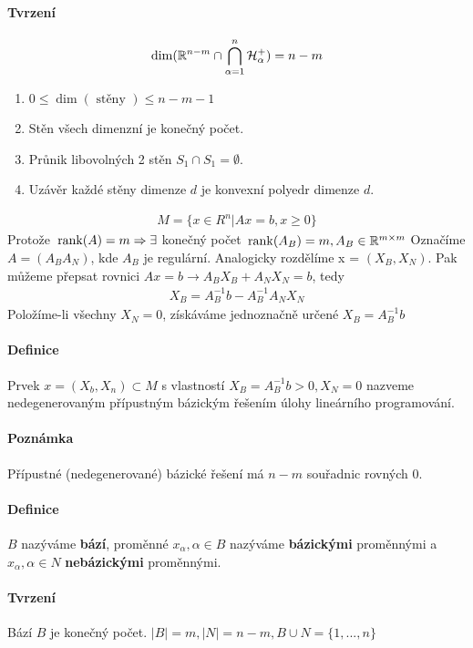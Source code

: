 \documentclass[a4paper,12pt,titlepage]{article}
\begin{document}
\paragraph{Tvrzení}
\begin{align}
	\dim( \mathbb{R}^{n-m} \cap \bigcap_{\alpha=1}^n \mathcal{H}_\alpha^+ ) = n - m 
\end{align}
\begin{enumerate}
	\item $0 \le \dim( \text{ stěny } ) \le n-m-1$
	\item Stěn všech dimenzní je konečný počet.
	\item Průnik libovolných 2 stěn $S_1 \cap S_1 = \emptyset$. 
	\item Uzávěr každé stěny dimenze $d$ je konvexní polyedr dimenze $d$.
\end{enumerate}
\begin{align}
	M = \{ x \in R^n | Ax = b, x \ge 0 \}
\end{align}
Protože $\operatorname*{\,rank}(A) = m \Rightarrow \exists$ konečný počet $\operatorname*{\,rank}(A_B) = m, A_B
\in \mathbb{R}^{m\times m}$
Označíme $A = (A_B A_N)$, kde $A_B$ je regulární. Analogicky rozdělíme x = $(X_B,
X_N)$. Pak můžeme přepsat rovnici $Ax = b \to A_B X_B + A_N X_N = b$, 
tedy 
\begin{align}
	X_B = A_B^{-1}b - A_B^{-1}A_N X_N
\end{align}
Položíme-li všechny $X_N = 0$, získáváme jednoznačně určené $X_B = A_B^{-1} b$
\paragraph{Definice}
Prvek $x = (X_b, X_n) \subset M$ s vlastností $X_B = A_B^{-1} b > 0, X_N = 0$
nazveme nedegenerovaným přípustným bázickým řešením úlohy lineárního
programování.
\paragraph{Poznámka}
Přípustné (nedegenerované) bázické řešení má $n-m$ souřadnic rovných 0.
\paragraph{Definice}
$B$ nazýváme \textbf{bází}, proměnné $x_\alpha, \alpha \in B$ nazýváme \textbf{bázickými}
proměnnými a $x_\alpha, \alpha \in N$ \textbf{nebázickými} proměnnými.
\paragraph{Tvrzení}
Bází $B$ je konečný počet. $|B| = m, |N| = n-m, B \cup N = \{ 1, ..., n \}$
\end{document}
